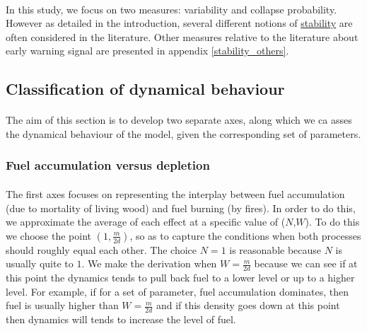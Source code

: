 \documentclass{article}
\begin{document}
\paragraph{}
In this study, we focus on two measures: variability and collapse probability. However as detailed in the introduction, several different notions of \hyperref[stability_litterature]{stability} are often considered in the literature. Other measures relative to the literature about early warning signal are presented in appendix \ref{stability_others}.

\subsection{Classification of dynamical behaviour}

\label{axes_definition}

\paragraph{}
The aim of this section is to develop two separate axes, along which we ca asses the dynamical behaviour of the model, given the corresponding set of parameters.

\subsubsection{Fuel accumulation versus depletion}

\paragraph{}
The first axes focuses on representing the interplay between fuel accumulation (due to mortality of living wood) and fuel burning (by fires). In order to do this, we approximate the average of each effect at a specific value of ($N$,$W$). To do this we choose the point $(1, \frac{m}{2d})$, so as to capture the conditions when both processes should roughly equal each other. The choice $N=1$ is reasonable because $N$ is usually quite to $1$. We make the derivation when $W = \frac{m}{2d}$ because we can see if at this point the dynamics tends to pull back fuel to a lower level or up to a higher level. For example, if for a set of parameter, fuel accumulation dominates, then fuel is usually higher than $W = \frac{m}{2d}$ and if this density goes down at this point then dynamics will tends to increase the level of fuel.
\end{document}
